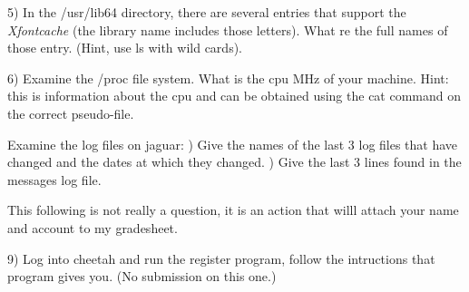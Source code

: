 5) In the {\ltt{}/usr/lib64} directory, there are several entries that support
the {\it Xfontcache} (the library name includes those letters). What re the
full names of those entry.
(Hint, use ls with wild cards).

6) Examine the {\ltt{}/proc} file system.
What is the cpu MHz of your machine.
Hint: this is information about the cpu and can be obtained using the
cat command on the correct pseudo-file.

Examine the log files on {\ltt{}jaguar}:
\hfill{}) Give the names of the last 3 log files that have changed and 
the dates at which they changed.
\hfill{}) Give the last 3 lines found in the {\ltt{}messages} log file.

This following is not really a question, it is an action that
willl attach your name and account to my gradesheet.

9) Log into {\ltt{}cheetah} and run the {\ltt{}register} program,
follow the intructions that program gives you.
(No submission on this one.)

\bye
